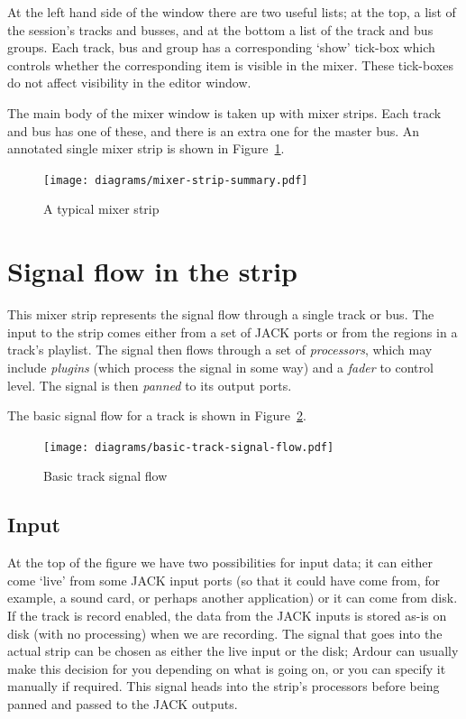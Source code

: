 \documentclass[10pt,a4paper]{book}
\begin{document}
{At the left hand side of the window there are two useful lists; at the
top, a list of the session's tracks and busses, and at the bottom a
list of the track and bus groups.  Each track, bus and group has a
corresponding `show' tick-box which controls whether the corresponding
item is visible in the mixer.  These tick-boxes do not affect
visibility in the editor window.

The main body of the mixer window is taken up with mixer strips.  Each
track and bus has one of these, and there is an extra one for the
master bus.  An annotated single mixer strip is shown in
Figure~\ref{fig:mixer-strip-summary}.

\begin{figure}[ht]
\begin{center}
\texttt{[image: diagrams/mixer-strip-summary.pdf]}
\end{center}
\caption{A typical mixer strip}
\label{fig:mixer-strip-summary}
\end{figure}

\section{Signal flow in the strip}

This mixer strip represents the signal flow through a single track or
bus.  The input to the strip comes either from a set of JACK ports or
from the regions in a track's playlist.  The signal then flows through
a set of \emph{processors}, which may include \emph{plugins} (which
process the signal in some way) and a \emph{fader} to control level.
The signal is then \emph{panned} to its output ports.

The basic signal flow for a track is shown in
Figure~\ref{fig:basic-track-signal-flow}.

\begin{figure}[ht]
\begin{center}
\texttt{[image: diagrams/basic-track-signal-flow.pdf]}
\end{center}
\caption{Basic track signal flow}
\label{fig:basic-track-signal-flow}
\end{figure}

\subsection{Input}

At the top of the figure we have two possibilities for input data; it
can either come `live' from some JACK input ports (so that it could
have come from, for example, a sound card, or perhaps another
application) or it can come from disk.  If the track is record
enabled, the data from the JACK inputs is stored as-is on disk (with
no processing) when we are recording.  The signal that goes into the
actual strip can be chosen as either the live input or the disk;
Ardour can usually make this decision for you depending on what is
going on, or you can specify it manually if required.  This signal
heads into the strip's processors before being panned and passed to
the JACK outputs.

}
\end{document}
